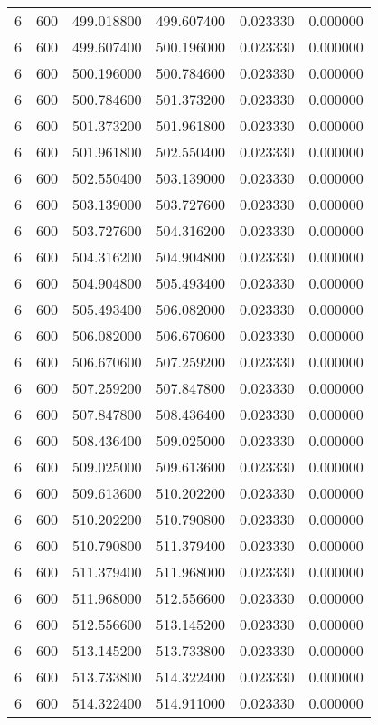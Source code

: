 \begin{longtable}{rrrrrr}
6 & 600 & 499.018800 & 499.607400 & 0.023330 & 0.000000 \\
6 & 600 & 499.607400 & 500.196000 & 0.023330 & 0.000000 \\
6 & 600 & 500.196000 & 500.784600 & 0.023330 & 0.000000 \\
6 & 600 & 500.784600 & 501.373200 & 0.023330 & 0.000000 \\
6 & 600 & 501.373200 & 501.961800 & 0.023330 & 0.000000 \\
6 & 600 & 501.961800 & 502.550400 & 0.023330 & 0.000000 \\
6 & 600 & 502.550400 & 503.139000 & 0.023330 & 0.000000 \\
6 & 600 & 503.139000 & 503.727600 & 0.023330 & 0.000000 \\
6 & 600 & 503.727600 & 504.316200 & 0.023330 & 0.000000 \\
6 & 600 & 504.316200 & 504.904800 & 0.023330 & 0.000000 \\
6 & 600 & 504.904800 & 505.493400 & 0.023330 & 0.000000 \\
6 & 600 & 505.493400 & 506.082000 & 0.023330 & 0.000000 \\
6 & 600 & 506.082000 & 506.670600 & 0.023330 & 0.000000 \\
6 & 600 & 506.670600 & 507.259200 & 0.023330 & 0.000000 \\
6 & 600 & 507.259200 & 507.847800 & 0.023330 & 0.000000 \\
6 & 600 & 507.847800 & 508.436400 & 0.023330 & 0.000000 \\
6 & 600 & 508.436400 & 509.025000 & 0.023330 & 0.000000 \\
6 & 600 & 509.025000 & 509.613600 & 0.023330 & 0.000000 \\
6 & 600 & 509.613600 & 510.202200 & 0.023330 & 0.000000 \\
6 & 600 & 510.202200 & 510.790800 & 0.023330 & 0.000000 \\
6 & 600 & 510.790800 & 511.379400 & 0.023330 & 0.000000 \\
6 & 600 & 511.379400 & 511.968000 & 0.023330 & 0.000000 \\
6 & 600 & 511.968000 & 512.556600 & 0.023330 & 0.000000 \\
6 & 600 & 512.556600 & 513.145200 & 0.023330 & 0.000000 \\
6 & 600 & 513.145200 & 513.733800 & 0.023330 & 0.000000 \\
6 & 600 & 513.733800 & 514.322400 & 0.023330 & 0.000000 \\
6 & 600 & 514.322400 & 514.911000 & 0.023330 & 0.000000 \\

\end{longtable}

